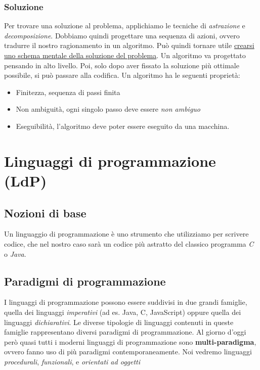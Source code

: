\documentclass{article}
\begin{document}
\subsubsection*{Soluzione}
Per trovare una soluzione al problema, applichiamo le tecniche di \emph{astrazione} e \emph{decomposizione}.
Dobbiamo quindi progettare una sequenza di azioni, ovvero tradurre il nostro ragionamento in un algoritmo. Può quindi tornare utile \underline{crearsi uno schema mentale della soluzione del problema}.
Un algoritmo va progettato pensando in alto livello. Poi, solo dopo aver fissato la soluzione più ottimale possibile, si può passare alla codifica.
Un algoritmo ha le seguenti proprietà:
\begin{itemize}
  \item Finitezza, sequenza di passi finita
  \item Non ambiguità, ogni singolo passo deve essere \emph{non ambiguo}
  \item Eseguibilità, l'algoritmo deve poter essere eseguito da una macchina.
\end{itemize}
\pagebreak

\section{Linguaggi di programmazione (LdP)}
\subsection{Nozioni di base}
Un linguaggio di programmazione è uno strumento che utilizziamo per scrivere codice, che nel nostro caso sarà un codice più astratto del classico programma \emph{C} o \emph{Java}.
\subsection*{Paradigmi di programmazione}
I linguaggi di programmazione possono essere suddivisi in due grandi famiglie, quella dei linguaggi \emph{imperativi} (ad es. Java, C, JavaScript) oppure quella dei linguaggi \emph{dichiarativi}. Le diverse tipologie di linguaggi contenuti in queste famiglie rappresentano diversi paradigmi di programmazione.
Al giorno d'oggi però quasi tutti i moderni linguaggi di programmazione sono \textbf{multi-paradigma}, ovvero fanno uso di più paradigmi contemporaneamente. Noi vedremo linguaggi \emph{procedurali}, \emph{funzionali}, e \emph{orientati ad oggetti}
\end{document}
